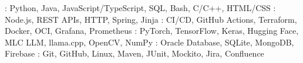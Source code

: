 
    {: Python, Java, JavaScript/TypeScript, SQL, Bash, C/C++, HTML/CSS}
    {: Node.js, REST APIs, HTTP, Spring, Jinja}
    {: CI/CD, GitHub Actions, Terraform, Docker, OCI, Grafana, Prometheus}
    {: PyTorch, TensorFlow, Keras, Hugging Face, MLC LLM, llama.cpp, OpenCV, NumPy}
    {: Oracle Database, SQLite, MongoDB, Firebase}
    {: Git, GitHub, Linux, Maven, JUnit, Mockito, Jira, Confluence}